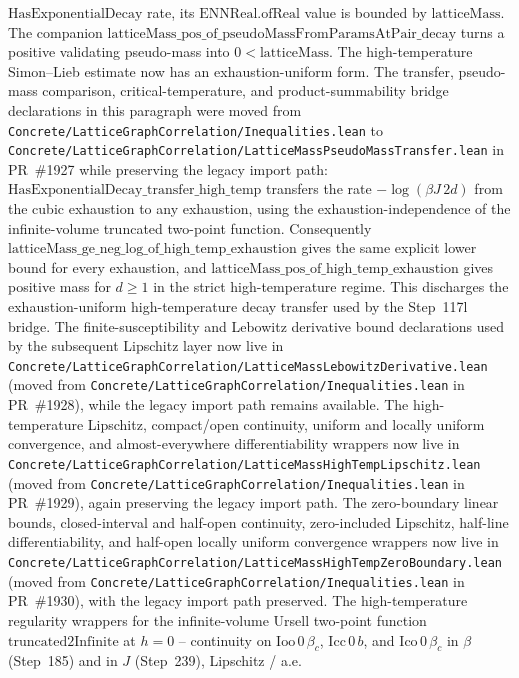 \documentclass[a4paper,11pt]{article}
\begin{document}
$\mathrm{HasExponentialDecay}$ rate, its
$\mathrm{ENNReal.ofReal}$ value is bounded by
$\mathrm{latticeMass}$. The companion
$\mathrm{latticeMass\_pos\_of\_pseudoMassFromParamsAtPair\_decay}$
turns a positive validating pseudo-mass into $0 < \mathrm{latticeMass}$.
The high-temperature Simon--Lieb estimate now has an exhaustion-uniform
form.  The transfer, pseudo-mass comparison, critical-temperature, and
product-summability bridge declarations in this paragraph were moved from
\texttt{Concrete/LatticeGraphCorrelation/Inequalities.lean} to
\texttt{Concrete/LatticeGraphCorrelation/LatticeMassPseudoMassTransfer.lean}
in PR~\#1927 while preserving the legacy import path:
$\mathrm{HasExponentialDecay\_transfer\_high\_temp}$ transfers the
rate $-\log(\beta J\,2d)$ from the cubic exhaustion to any exhaustion,
using the exhaustion-independence of the infinite-volume truncated
two-point function. Consequently
$\mathrm{latticeMass\_ge\_neg\_log\_of\_high\_temp\_exhaustion}$
gives the same explicit lower bound for every exhaustion, and
$\mathrm{latticeMass\_pos\_of\_high\_temp\_exhaustion}$ gives positive
mass for $d \ge 1$ in the strict high-temperature regime. This discharges the
exhaustion-uniform high-temperature decay transfer used by the
Step~117l bridge.
The finite-susceptibility and Lebowitz derivative bound declarations
used by the subsequent Lipschitz layer now live in
\texttt{Concrete/LatticeGraphCorrelation/LatticeMassLebowitzDerivative.lean}
(moved from \texttt{Concrete/LatticeGraphCorrelation/Inequalities.lean}
in PR~\#1928), while the legacy import path remains available.
The high-temperature Lipschitz, compact/open continuity, uniform and locally
uniform convergence, and almost-everywhere differentiability wrappers now live
in
\texttt{Concrete/LatticeGraphCorrelation/LatticeMassHighTempLipschitz.lean}
(moved from \texttt{Concrete/LatticeGraphCorrelation/Inequalities.lean}
in PR~\#1929), again preserving the legacy import path.
The zero-boundary linear bounds, closed-interval and half-open continuity,
zero-included Lipschitz, half-line differentiability, and half-open locally
uniform convergence wrappers now live in
\texttt{Concrete/LatticeGraphCorrelation/LatticeMassHighTempZeroBoundary.lean}
(moved from \texttt{Concrete/LatticeGraphCorrelation/Inequalities.lean}
in PR~\#1930), with the legacy import path preserved.
The high-temperature regularity wrappers for the infinite-volume Ursell
two-point function $\mathrm{truncated2Infinite}$ at $h = 0$ -- continuity on
$\mathrm{Ioo}\,0\,\beta_c$, $\mathrm{Icc}\,0\,b$, and $\mathrm{Ico}\,0\,\beta_c$
in $\beta$ (Step~185) and in $J$ (Step~239), Lipschitz / a.e.\
\end{document}
